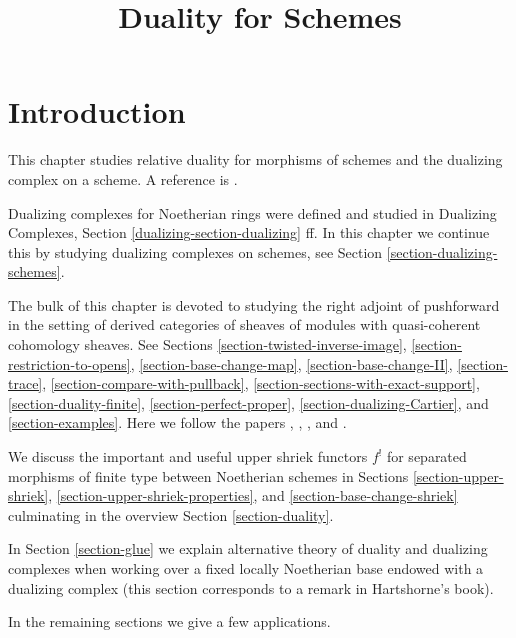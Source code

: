 \documentclass{stacks-project}
\theoremstyle{plain}
\theoremstyle{definition}
\theoremstyle{remark}
\numberwithin{equation}{subsection}
\begin{document}
\title{Duality for Schemes}


\maketitle

\label{section-phantom}

\tableofcontents

\section{Introduction}
\label{section-introduction}

\noindent
This chapter studies relative duality for morphisms of schemes
and the dualizing complex on a scheme. A reference is \cite{RD}.

\medskip\noindent
Dualizing complexes for Noetherian rings were defined and studied in
Dualizing Complexes, Section \ref{dualizing-section-dualizing} ff.
In this chapter we continue this by studying dualizing complexes on
schemes, see Section \ref{section-dualizing-schemes}.

\medskip\noindent
The bulk of this chapter is devoted to studying the right adjoint
of pushforward in the setting of derived categories of sheaves
of modules with quasi-coherent cohomology sheaves.
See Sections
\ref{section-twisted-inverse-image},
\ref{section-restriction-to-opens},
\ref{section-base-change-map},
\ref{section-base-change-II},
\ref{section-trace},
\ref{section-compare-with-pullback},
\ref{section-sections-with-exact-support},
\ref{section-duality-finite},
\ref{section-perfect-proper},
\ref{section-dualizing-Cartier}, and
\ref{section-examples}.
Here we follow the papers 
\cite{Neeman-Grothendieck}, \cite{LN},
\cite{Lipman-notes}, and \cite{Neeman-improvement}.

\medskip\noindent
We discuss the important and useful upper shriek functors $f^!$ for
separated morphisms of finite type between Noetherian schemes in
Sections \ref{section-upper-shriek},
\ref{section-upper-shriek-properties}, and
\ref{section-base-change-shriek}
culminating in the overview Section
\ref{section-duality}.

\medskip\noindent
In Section \ref{section-glue}
we explain alternative theory of duality and dualizing
complexes when working over a fixed locally Noetherian
base endowed with a dualizing complex (this section corresponds
to a remark in Hartshorne's book).

\medskip\noindent
In the remaining sections we give a few applications.
\end{document}
